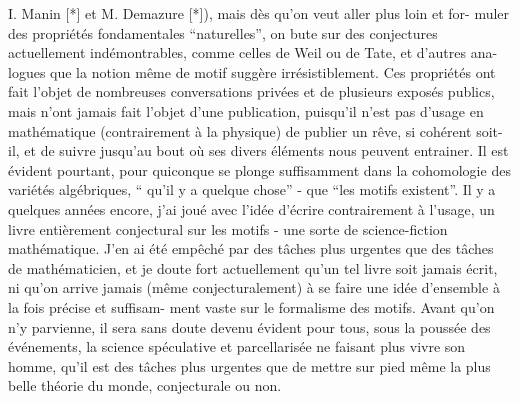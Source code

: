 
I. Manin [*] et M. Demazure [*]), mais dès qu'on veut aller plus loin et for-%
muler des propriétés fondamentales ``naturelles'', on bute sur des conjectures
actuellement indémontrables, comme celles de Weil ou de Tate, et d'autres ana-%
logues que la notion même de motif suggère irrésistiblement. Ces propriétés ont
fait l'objet de nombreuses conversations privées et de plusieurs exposés
publics, mais n'ont jamais fait l'objet d'une publication, puisqu'il n'est pas
d'usage en mathématique (contrairement à la physique) de publier un rêve, si
cohérent soit-il, et de suivre jusqu'au bout où ses divers éléments nous peuvent
entrainer. Il est évident pourtant, pour quiconque se plonge suffisamment dans
la cohomologie des variétés algébriques, `` qu'il y a quelque chose'' - que
``les motifs existent''. Il y a quelques années encore, j'ai joué avec l'idée
d'écrire contrairement à l'usage, un livre entièrement conjectural sur les
motifs - une sorte de science-fiction mathématique. J'en ai été empêché par
des tâches plus urgentes que des tâches de mathématicien, et je doute fort
actuellement qu'un tel livre soit jamais écrit, ni qu'on arrive jamais (même
conjecturalement) à se faire une idée d'ensemble à la fois précise et suffisam-%
ment vaste sur le formalisme des motifs. Avant qu'on n'y parvienne, il sera
sans doute devenu évident pour tous, sous la poussée des événements, la science
spéculative et parcellarisée ne faisant plus vivre son homme, qu'il est des
tâches plus urgentes que de mettre sur pied même la plus belle théorie du
monde, conjecturale ou non.

